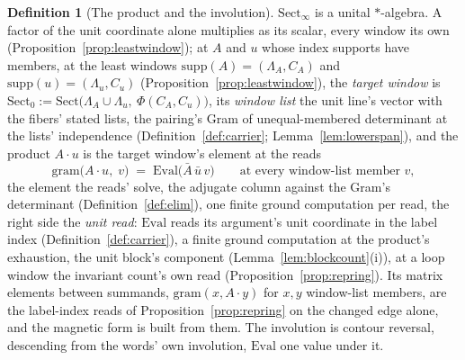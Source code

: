 \documentclass[11pt]{article}
\theoremstyle{definition}
\newtheorem{definition}{Definition}
\begin{document}
\begin{definition}[The product and the involution]\label{def:algebra}
$\mathrm{Sect}_\infty$ is a unital $\ast$-algebra. A factor of the
unit coordinate alone multiplies as its scalar, every window its
own (Proposition~\ref{prop:leastwindow}); at $A$ and $u$ whose
index supports have members, at the least windows
$\mathrm{supp}(A)=(\Lambda_A,C_A)$ and
$\mathrm{supp}(u)=(\Lambda_u,C_u)$
(Proposition~\ref{prop:leastwindow}), the \emph{target window} is
$\mathrm{Sect}_0:=\mathrm{Sect}\big(\Lambda_A\cup\Lambda_u,\
\Phi(C_A,C_u)\big)$, its \emph{window list} the unit line's vector
with the fibers' stated lists, the pairing's Gram of
unequal-membered determinant at the lists' independence
(Definition~\ref{def:carrier}; Lemma~\ref{lem:lowerspan}), and the
product $A\cdot u$ is the
target window's element at the reads
\[
\mathrm{gram}\big(A\cdot u,\;v\big)\;=\;\mathrm{Eval}\big(\bar A\,\bar u\,v\big)
\qquad\text{at every window-list member }v ,
\]
the element the reads' solve, the adjugate column against the
Gram's determinant (Definition~\ref{def:elim}), one finite ground
computation per read, the right side the \emph{unit read}: $\mathrm{Eval}$ reads its
argument's unit coordinate in the label index
(Definition~\ref{def:carrier}), a finite ground computation at
the product's exhaustion, the unit block's component
(Lemma~\ref{lem:blockcount}(i)), at a loop window the invariant
count's own read (Proposition~\ref{prop:repring}). Its matrix elements between
summands, $\mathrm{gram}(x,A\cdot y)$ for $x,y$ window-list members,
are the label-index reads
of Proposition~\ref{prop:repring} on the changed edge alone, and the
magnetic form is built from them. The involution is contour reversal, descending from the words' own
involution, $\mathrm{Eval}$ one value under it.
\end{definition}
\end{document}
